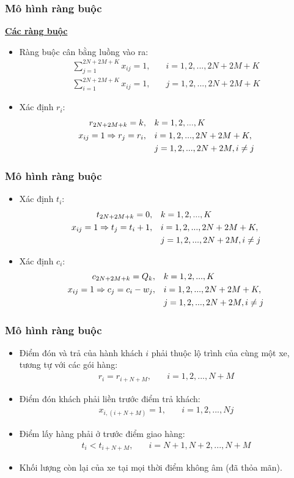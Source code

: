\documentclass{beamer}
\begin{document}
	\begin{frame}
		\frametitle{Mô hình ràng buộc}
		\textbf{\underline{Các ràng buộc}}
		\begin{itemize}
			\item Ràng buộc cân bằng luồng vào ra:
			\begin{align}
				\sum_{j=1}^{2N+2M+K} x_{ij} = 1,\quad & i=1,2,...,2N+2M+K \\
				\sum_{i=1}^{2N+2M+K} x_{ij} = 1,\quad & j=1,2,...,2N+2M+K
			\end{align}
			\item Xác định $r_i$:
			\begin{align}
				r_{2N+2M+k} = k,\quad & k=1,2,...,K \\
				x_{ij}=1\Rightarrow r_j=r_i,\quad & i=1,2,...,2N+2M+K, \\
				& j=1,2,...,2N+2M, i\ne j \notag
			\end{align}
		\end{itemize}
	\end{frame}
	\begin{frame}
		\frametitle{Mô hình ràng buộc}
		\begin{itemize}
			\item Xác định $t_i$:
			\begin{align}
				t_{2N+2M+k} = 0,\quad & k=1,2,...,K \\
				x_{ij}=1\Rightarrow t_j=t_i + 1,\quad & i=1,2,...,2N+2M+K, \\
				& j=1,2,...,2N+2M,i\ne j \notag
			\end{align}
			\item Xác định $c_i$:
			\begin{align}
				c_{2N+2M+k} = Q_k,\quad & k=1,2,...,K \\
				x_{ij}=1\Rightarrow c_j=c_i - w_j,\quad & i=1,2,...,2N+2M+K, \\
				& j=1,2,...,2N+2M,i\ne j \notag
			\end{align}
		\end{itemize}
	\end{frame}
	\begin{frame}
		\frametitle{Mô hình ràng buộc}
		\begin{itemize}
			\item Điểm đón và trả của hành khách $i$ phải thuộc lộ trình của cùng một xe, tương tự với các gói hàng:
			\begin{align}
				r_i = r_{i+N+M},\quad & i=1,2,...,N+M
			\end{align}
			\item Điểm đón khách phải liền trước điểm trả khách:
			\begin{align}
				x_{i,(i+N+M)} = 1,\quad & i=1,2,...,Nj
			\end{align}
			\item Điểm lấy hàng phải ở trước điểm giao hàng:
			\begin{align}
				t_i < t_{i+N+M},\quad & i=N+1,N+2,...,N+M
			\end{align}
			\item Khối lượng còn lại của xe tại mọi thời điểm không âm (đã thỏa mãn).
		\end{itemize}
	\end{frame}
\end{document}
